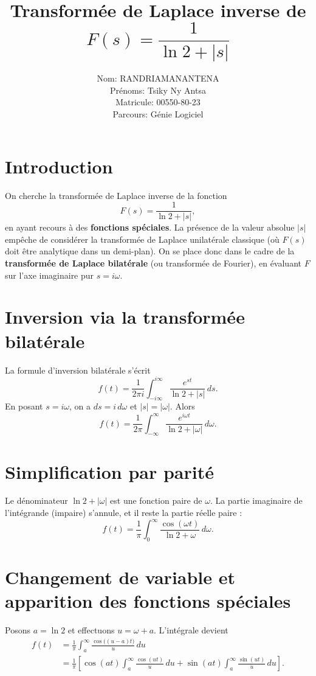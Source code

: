 \documentclass[12pt,a4paper]{article}
\title{Transformée de Laplace inverse de $F(s)=\dfrac{1}{\ln 2 + |s|}$}
\author{Nom: RANDRIAMANANTENA \\
Prénoms: Tsiky Ny Antsa \\
Matricule: 00550-80-23 \\
Parcours: Génie Logiciel}
\begin{document}
\maketitle

\section{Introduction}
On cherche la transformée de Laplace inverse de la fonction
\[
F(s) = \frac{1}{\ln 2 + |s|},
\]
en ayant recours à des \textbf{fonctions spéciales}.  
La présence de la valeur absolue $|s|$ empêche de considérer la transformée de Laplace unilatérale classique (où $F(s)$ doit être analytique dans un demi-plan). On se place donc dans le cadre de la \textbf{transformée de Laplace bilatérale} (ou transformée de Fourier), en évaluant $F$ sur l'axe imaginaire pur $s = i\omega$.

\section{Inversion via la transformée bilatérale}
La formule d'inversion bilatérale s'écrit
\[
f(t) = \frac{1}{2\pi i} \int_{-i\infty}^{i\infty} \frac{e^{st}}{\ln 2 + |s|} \, ds .
\]
En posant $s = i\omega$, on a $ds = i\,d\omega$ et $|s| = |\omega|$. Alors
\[
f(t) = \frac{1}{2\pi} \int_{-\infty}^{\infty} \frac{e^{i\omega t}}{\ln 2 + |\omega|} \, d\omega .
\]

\section{Simplification par parité}
Le dénominateur $\ln 2 + |\omega|$ est une fonction paire de $\omega$. La partie imaginaire de l'intégrande (impaire) s'annule, et il reste la partie réelle paire :
\[
f(t) = \frac{1}{\pi} \int_{0}^{\infty} \frac{\cos(\omega t)}{\ln 2 + \omega} \, d\omega .
\]

\section{Changement de variable et apparition des fonctions spéciales}
Posons $a = \ln 2$ et effectuons $u = \omega + a$. L'intégrale devient
\begin{align*}
f(t) &= \frac{1}{\pi} \int_{a}^{\infty} \frac{\cos\big((u - a)t\big)}{u} \, du \\
     &= \frac{1}{\pi} \left[ \cos(at) \int_{a}^{\infty} \frac{\cos(ut)}{u} \, du 
                      + \sin(at) \int_{a}^{\infty} \frac{\sin(ut)}{u} \, du \right].
\end{align*}
\end{document}
